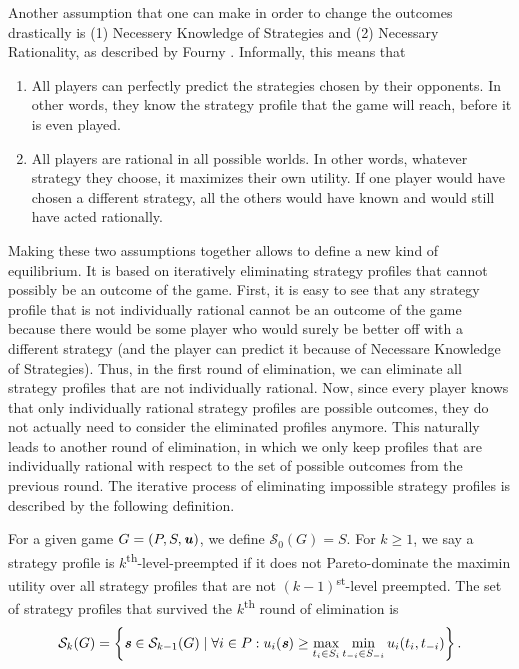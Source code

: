Another assumption that one can make in order to change the outcomes drastically is (1) Necessery Knowledge of Strategies and (2) Necessary Rationality, as described by Fourny \cite{Fourny20}.
Informally, this means that
\begin{enumerate}[label=(\arabic*)]
  \item All players can perfectly predict the strategies chosen by their opponents.
  In other words, they know the strategy profile that the game will reach, before it is even played.
  \item All players are rational in all possible worlds.
  In other words, whatever strategy they choose, it maximizes their own utility.
  If one player would have chosen a different strategy, all the others would have known and would still have acted rationally.
\end{enumerate}
Making these two assumptions together allows to define a new kind of equilibrium.
It is based on iteratively eliminating strategy profiles that cannot possibly be an outcome of the game.
First, it is easy to see that any strategy profile that is not individually rational cannot be an outcome of the game because there would be some player who would surely be better off with a different strategy (and the player can predict it because of Necessare Knowledge of Strategies).
Thus, in the first round of elimination, we can eliminate all strategy profiles that are not individually rational.
Now, since every player knows that only individually rational strategy profiles are possible outcomes, they do not actually need to consider the eliminated profiles anymore.
This naturally leads to another round of elimination, in which we only keep profiles that are individually rational with respect to the set of possible outcomes from the previous round.
The iterative process of eliminating impossible strategy profiles is described by the following definition.

\begin{definition}
  For a given game $G = (P, S, \boldsymbol{\mathit{u}})$, we define $\mathcal{S}_0(G) = S$.
  For $k \ge 1$, we say a strategy profile is $k$\textsuperscript{th}-level-preempted if it does not Pareto-dominate the maximin utility over all strategy profiles that are not $(k-1)$\textsuperscript{st}-level preempted.
  The set of strategy profiles that survived the $k$\textsuperscript{th} round of elimination is
  \[
    \mathcal{S}_k(G) = \left\{\boldsymbol{\mathit{s}} \in \mathcal{S}_{k-1}(G) \mid \forall i \in P: u_i(\boldsymbol{\mathit{s}}) \ge \max_{t_i \in S_i}\min_{t_{-i} \in S_{-i}} u_i(t_i, t_{-i})\right\}.
  \]
\end{definition}

